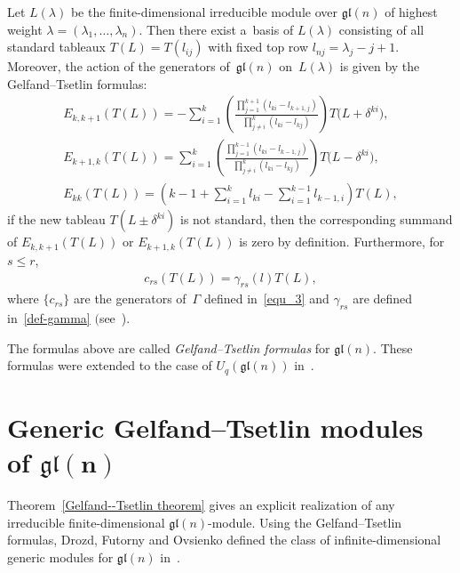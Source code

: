 \begin{Theorem}[\cite{GT}]\label{Gelfand--Tsetlin theorem}
Let $L(\lambda)$ be the finite-dimensional irreducible module over $\mathfrak{gl}(n)$ of highest weight
$\lambda=(\lambda_{1},\ldots,\lambda_{n})$.
Then there exist a~basis of $L(\lambda)$ consisting of all standard tableaux $T(L) = T(l_{ij})$ with fixed top row
$l_{nj}=\lambda_j-j+1$.
Moreover, the action of the generators of~$\mathfrak{gl}(n)$ on~$L(\lambda)$ is given by the Gelfand--Tsetlin
formulas:
\begin{gather}
E_{k,k+1}(T(L)) =-\sum\limits_{i=1}^{k}\left(\frac{\prod\limits_{j=1}^{k+1}(l_{ki}-l_{k+1,j})}{\prod\limits_{j\neq
i}^{k}(l_{ki}-l_{kj})}\right)T\big(L+\delta^{ki}\big),
\nonumber
\\
E_{k+1,k}(T(L)) =\sum\limits_{i=1}^{k}\left(\frac{\prod\limits_{j=1}^{k-1}(l_{ki}-l_{k-1,j})}{\prod\limits_{j\neq
i}^{k}(l_{ki}-l_{kj})}\right)T\big(L-\delta^{ki}\big),
\nonumber
\\
E_{kk}(T(L)) =\left(k-1+\sum\limits_{i=1}^{k}l_{ki}-\sum\limits_{i=1}^{k-1}l_{k-1,i}\right)T(L),
\label{Gelfand--Tsetlin formulas}
\end{gather}
if the new tableau $T(L\pm\delta^{ki})$ is not standard, then the corresponding summand of $E_{k,k+1}(T(L))$ or
$E_{k+1,k}(T(L))$ is zero by definition.
Furthermore, for $s\leq r$,
\begin{gather}
\label{action of Gamma in finite dimensional modules}
c_{rs}(T(L))=\gamma_{rs}(l)T(L),
\end{gather}
where $\{c_{rs}\}$ are the generators of~$\Gamma$ defined in~\eqref{equ_3} and $\gamma_{rs}$ are defined
in~\eqref{def-gamma} $($see~{\rm \cite{Zh})}.
\end{Theorem}
\noindent The formulas above are called \emph{Gelfand--Tsetlin formulas} for $\mathfrak{gl}(n)$.
These formulas were extended to the case of $U_{q}(\mathfrak{gl}(n))$ in~\cite{Tar-Naz}.

\section[Generic Gelfand--Tsetlin modules of $\mathfrak{gl}(n)$]{Generic Gelfand--Tsetlin modules of $\boldsymbol{\mathfrak{gl}(n)}$}
\label{section5}

Theorem~\ref{Gelfand--Tsetlin theorem} gives an explicit realization of any irreducible f\/inite-dimensional
$\mathfrak{gl}(n)$-module.
Using the Gelfand--Tsetlin formulas, Drozd, Futorny and Ovsienko def\/ined the class of inf\/inite-dimensional generic
modules for $\mathfrak{gl}(n)$ in~\cite{DFO3}.

